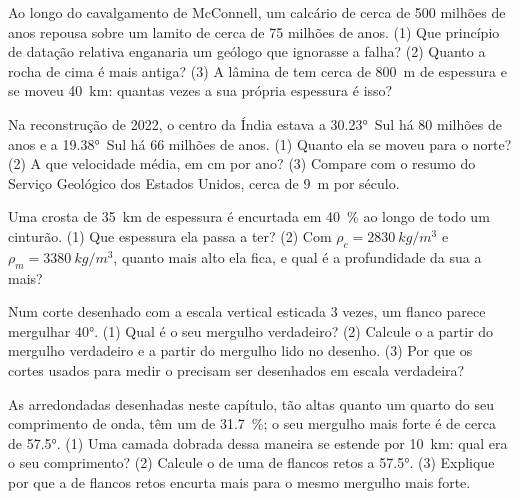 \begin{exercise}[$\star\star$]\label{exo:g12:mountain-building:8}
Ao longo do cavalgamento de McConnell, um calcário de cerca de 500 milhões
de anos repousa sobre um lamito de cerca de 75 milhões de anos. (1) Que
princípio de datação relativa enganaria um geólogo que ignorasse a falha?
(2) Quanto a rocha de cima é mais antiga? (3) A lâmina de  tem
cerca de \qty{800}{m} de espessura e se moveu \qty{40}{km}: quantas vezes a
sua própria espessura é isso?
\end{exercise}

\begin{exercise}[$\star\star$]\label{exo:g12:mountain-building:9}
Na reconstrução de 2022, o centro da Índia estava a \ang{30.23}~Sul há 80
milhões de anos e a \ang{19.38}~Sul há 66 milhões de anos. (1) Quanto ela se
moveu para o norte? (2) A que velocidade média, em \unit{cm} por ano?
(3) Compare com o resumo do Serviço Geológico dos Estados Unidos, cerca de
\qty{9}{m} por século.
\end{exercise}

\begin{exercise}[$\star\star$]\label{exo:g12:mountain-building:10}
Uma crosta de \qty{35}{km} de espessura é encurtada em \qty{40}{\percent}
ao longo de todo um cinturão. (1) Que espessura ela passa a ter? (2) Com $\rho_c =
\qty{2830}{kg/m^3}$ e $\rho_m = \qty{3380}{kg/m^3}$, quanto mais
alto ela fica, e qual é a profundidade da sua  a mais?
\end{exercise}

\begin{exercise}[$\star\star$]\label{exo:g12:mountain-building:11}
Num corte desenhado com a escala vertical esticada 3 vezes, um flanco
parece mergulhar \ang{40}. (1) Qual é o seu mergulho verdadeiro? (2) Calcule
o  a partir do mergulho verdadeiro e a partir do mergulho lido
no desenho. (3) Por que os cortes usados para medir o  precisam
ser desenhados em escala verdadeira?
\end{exercise}

\begin{exercise}[$\star\star\star$]\label{exo:g12:mountain-building:12}
As  arredondadas desenhadas neste capítulo, tão altas quanto um
quarto do seu comprimento de onda, têm um  de
\qty{31.7}{\percent}; o seu mergulho mais forte é de cerca de \ang{57.5}.
(1) Uma camada dobrada dessa maneira se estende por \qty{10}{km}: qual era o
seu comprimento? (2) Calcule o  de uma  de flancos retos a
\ang{57.5}. (3) Explique por que a  de flancos retos encurta mais para
o mesmo mergulho mais forte.
\end{exercise}

